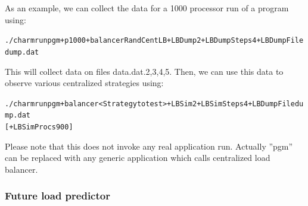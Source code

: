 As an example, we can collect the data for a 1000 processor run of a program using:
\begin{alltt}
./charmrun pgm +p1000 +balancer RandCentLB +LBDump 2 +LBDumpSteps 4 +LBDumpFile dump.dat
\end{alltt}
This will collect data on files data.dat.{2,3,4,5}. Then, we can use this data to observe various centralized strategies using:
\begin{alltt}
./charmrun pgm +balancer <Strategy to test> +LBSim 2 +LBSimSteps 4 +LBDumpFile dump.dat
[+LBSimProcs 900]
\end{alltt}
Please note that this does not invoke any real application run. Actually
 ''pgm'' can be replaced with any generic application which calls centralized load balancer.

\subsubsection{Future load predictor}

